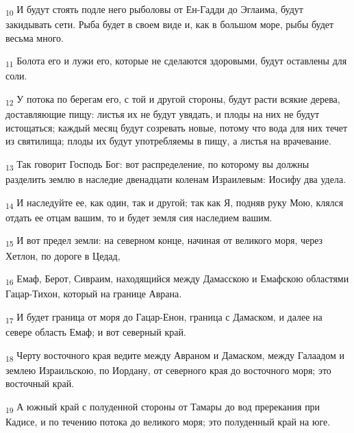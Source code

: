 \begin{tcolorbox}
\textsubscript{10} И будут стоять подле него рыболовы от Ен-Гадди до Эглаима, будут закидывать сети. Рыба будет в своем виде и, как в большом море, рыбы будет весьма много.
\end{tcolorbox}
\begin{tcolorbox}
\textsubscript{11} Болота его и лужи его, которые не сделаются здоровыми, будут оставлены для соли.
\end{tcolorbox}
\begin{tcolorbox}
\textsubscript{12} У потока по берегам его, с той и другой стороны, будут расти всякие дерева, доставляющие пищу: листья их не будут увядать, и плоды на них не будут истощаться; каждый месяц будут созревать новые, потому что вода для них течет из святилища; плоды их будут употребляемы в пищу, а листья на врачевание.
\end{tcolorbox}
\begin{tcolorbox}
\textsubscript{13} Так говорит Господь Бог: вот распределение, по которому вы должны разделить землю в наследие двенадцати коленам Израилевым: Иосифу два удела.
\end{tcolorbox}
\begin{tcolorbox}
\textsubscript{14} И наследуйте ее, как один, так и другой; так как Я, подняв руку Мою, клялся отдать ее отцам вашим, то и будет земля сия наследием вашим.
\end{tcolorbox}
\begin{tcolorbox}
\textsubscript{15} И вот предел земли: на северном конце, начиная от великого моря, через Хетлон, по дороге в Цедад,
\end{tcolorbox}
\begin{tcolorbox}
\textsubscript{16} Емаф, Берот, Сивраим, находящийся между Дамасскою и Емафскою областями Гацар-Тихон, который на границе Аврана.
\end{tcolorbox}
\begin{tcolorbox}
\textsubscript{17} И будет граница от моря до Гацар-Енон, граница с Дамаском, и далее на севере область Емаф; и вот северный край.
\end{tcolorbox}
\begin{tcolorbox}
\textsubscript{18} Черту восточного края ведите между Авраном и Дамаском, между Галаадом и землею Израильскою, по Иордану, от северного края до восточного моря; это восточный край.
\end{tcolorbox}
\begin{tcolorbox}
\textsubscript{19} А южный край с полуденной стороны от Тамары до вод пререкания при Кадисе, и по течению потока до великого моря; это полуденный край на юге.
\end{tcolorbox}
